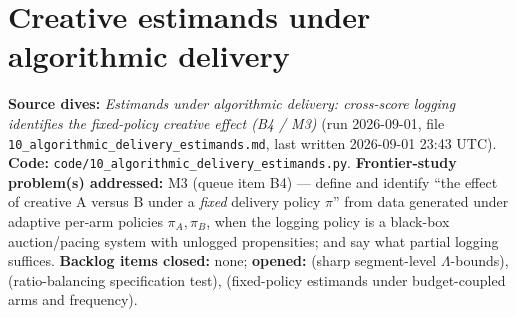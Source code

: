 \chapter{Creative estimands under algorithmic delivery}
\label{ch:algorithmic}

\begin{provenance}
\textbf{Source dives:}  \emph{Estimands under algorithmic delivery: cross-score logging identifies the fixed-policy creative effect (B4 / M3)} (run 2026-09-01, file \texttt{10\_algorithmic\_delivery\_estimands.md}, last written 2026-09-01 23:43 UTC).
\textbf{Code:} \texttt{code/10\_algorithmic\_delivery\_estimands.py}.
\textbf{Frontier-study problem(s) addressed:} M3 (queue item B4) --- define and identify ``the effect of creative A versus B under a \emph{fixed} delivery policy $\pi$'' from data generated under adaptive per-arm policies $\pi_A, \pi_B$, when the logging policy is a black-box auction/pacing system with unlogged propensities; and say what partial logging suffices.
\textbf{Backlog items closed:} none; \textbf{opened:}  (sharp segment-level $\Lambda$-bounds),  (ratio-balancing specification test),  (fixed-policy estimands under budget-coupled arms and frequency).
\end{provenance}

